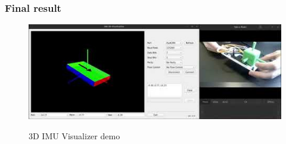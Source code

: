 \subsubsection{Final result}
\begin{figure}[H]
    \centering
        \href{https://youtu.be/qVYGa0Z1S-M}{
            \includegraphics[width=\linewidth]{./projects/pmodnav/pmodnav_thumbnail.jpg}
        }
        \caption{3D IMU Visualizer demo}
\end{figure}

